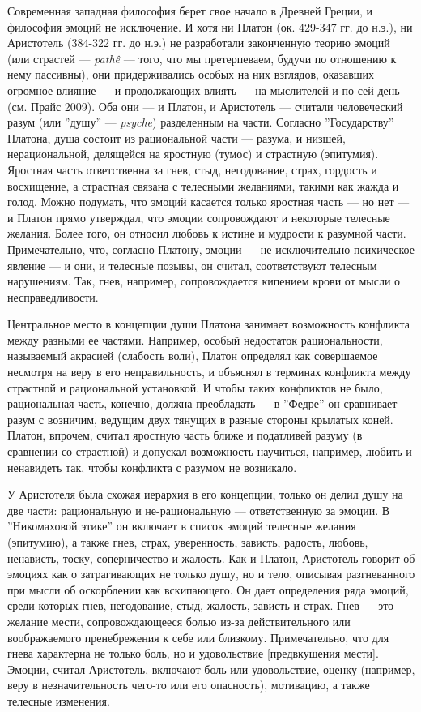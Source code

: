 \documentclass[11pt]{book}
\begin{document}
Современная западная философия берет свое начало в Древней Греции, и философия эмоций не исключение. И хотя ни Платон (ок. 429-347 гг. до н.э.), ни Аристотель (384-322 гг. до н.э.) не разработали законченную теорию эмоций (или страстей --- \textit{pathê} --- того, что мы претерпеваем, будучи по отношению к нему пассивны), они придерживались особых на них взглядов, оказавших огромное влияние --- и продолжающих влиять --- на мыслителей и по сей день (см. Прайс 2009). Оба они --- и Платон, и Аристотель --- считали человеческий разум (или ''душу'' --- \textit{psyche}) разделенным на части. Согласно ''Государству'' Платона, душа состоит из рациональной части --- разума, и низшей, нерациональной, делящейся на яростную (тумос) и страстную (эпитумия). Яростная часть ответственна за гнев, стыд, негодование, страх, гордость и восхищение, а страстная связана с телесными желаниями, такими как жажда и голод. Можно подумать, что эмоций касается только яростная часть --- но нет --- и Платон прямо утверждал, что эмоции сопровождают и некоторые телесные желания. Более того, он относил любовь к истине и мудрости к разумной части. Примечательно, что, согласно Платону, эмоции --- не исключительно психическое явление --- и они, и телесные позывы, он считал, соответствуют телесным нарушениям. Так, гнев, например, сопровождается кипением крови от мысли о несправедливости.

Центральное место в концепции души Платона занимает возможность конфликта между разными ее частями. Например, особый недостаток рациональности, называемый акрасией (слабость воли), Платон определял как совершаемое несмотря на веру в его неправильность, и объяснял в терминах конфликта между страстной и рациональной установкой. И чтобы таких конфликтов не было, рациональная часть, конечно, должна преобладать --- в ''Федре'' он сравнивает разум с возничим, ведущим двух тянущих в разные стороны крылатых коней. Платон, впрочем, считал яростную часть ближе и податливей разуму (в сравнении со страстной) и допускал возможность научиться, например, любить и ненавидеть так, чтобы конфликта с разумом не возникало.

У Аристотеля была схожая иерархия в его концепции, только он делил душу на две части: рациональную и не-рациональную --- ответственную за эмоции. В ''Никомаховой этике'' он включает в список эмоций телесные желания (эпитумию), а также гнев, страх, уверенность, зависть, радость, любовь, ненависть, тоску, соперничество и жалость. Как и Платон, Аристотель говорит об эмоциях как о затрагивающих не только душу, но и тело, описывая разгневанного при мысли об оскорблении как вскипающего. Он дает определения ряда эмоций, среди которых гнев, негодование, стыд, жалость, зависть и страх. Гнев --- это желание мести, сопровождающееся болью из-за действительного или воображаемого пренебрежения к себе или близкому. Примечательно, что для гнева характерна не только боль, но и удовольствие [предвкушения мести]. Эмоции, считал Аристотель, включают боль или удовольствие, оценку (например, веру в незначительность чего-то или его опасность), мотивацию, а также телесные изменения.
\end{document}
